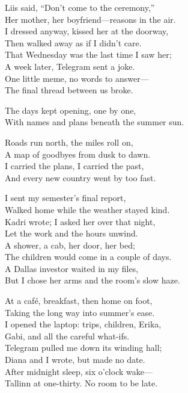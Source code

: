 \begin{lyrics}
Liis said, “Don’t come to the ceremony,”\\
Her mother, her boyfriend—reasons in the air.\\
I dressed anyway, kissed her at the doorway,\\
Then walked away as if I didn’t care.\\
That Wednesday was the last time I saw her;\\
A week later, Telegram sent a joke.\\
One little meme, no words to answer—\\
The final thread between us broke.

The days kept opening, one by one,\\
With names and plans beneath the summer sun.

Roads run north, the miles roll on,\\
A map of goodbyes from dusk to dawn.\\
I carried the plans, I carried the past,\\
And every new country went by too fast.

I sent my semester’s final report,\\
Walked home while the weather stayed kind.\\
Kadri wrote; I asked her over that night,\\
Let the work and the hours unwind.\\
A shower, a cab, her door, her bed;\\
The children would come in a couple of days.\\
A Dallas investor waited in my files,\\
But I chose her arms and the room’s slow haze.

At a café, breakfast, then home on foot,\\
Taking the long way into summer’s ease.\\
I opened the laptop: trips, children, Erika,\\
Gabi, and all the careful what-ifs.\\
Telegram pulled me down its winding hall;\\
Diana and I wrote, but made no date.\\
After midnight sleep, six o’clock wake—\\
Tallinn at one-thirty. No room to be late.


\end{lyrics}

